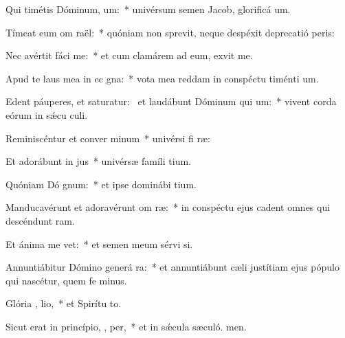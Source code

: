 \item Qui timétis Dóminum,  um:~* univérsum semen Jacob, glorificá um.
\item Tímeat eum om  raël:~* quóniam non sprevit, neque despéxit deprecatió peris:
\item Nec avértit fáci   me:~* et cum clamárem ad eum, exvit me.
\item Apud te laus mea in ec gna:~* vota mea reddam in conspéctu timénti um.
\item Edent páuperes, et saturatur:~\pscross{} et laudábunt Dóminum qui  um:~* vivent corda eórum in sǽcu culi.
\item Reminiscéntur et conver  minum~* univérsi fi ræ:
\item Et adorábunt in  jus~* univérsæ famíli tium.
\item Quóniam Dó  gnum:~* et ipse dominábi tium.
\item Manducavérunt et adoravérunt om  ræ:~* in conspéctu ejus cadent omnes qui descéndunt  ram.
\item Et ánima me  vet:~* et semen meum sérvi si.
\item Annuntiábitur Dómino generá ra:~* et annuntiábunt cæli justítiam ejus pópulo qui nascétur, quem fe minus.
\item Glória ,  lio,~* et Spirítu to.
\item Sicut erat in princípio,  ,  per,~* et in sǽcula sæculó. men.

